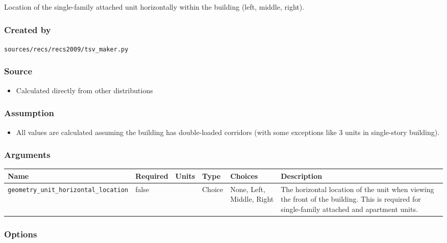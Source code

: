 Location of the single-family attached unit horizontally within the
building (left, middle, right).

\subsubsection{Created by}\label{created-by-44}

\texttt{sources/recs/recs2009/tsv\_maker.py}

\subsubsection{Source}\label{source-43}

\begin{itemize}
 
\item
  Calculated directly from other distributions
\end{itemize}

\subsubsection{Assumption}\label{assumption-24}

\begin{itemize}
 
\item
  All values are calculated assuming the building has double-loaded
  corridors (with some exceptions like 3 units in single-story
  building).
\end{itemize}

\subsubsection{Arguments}\label{arguments-28}

\begin{longtable}[]{@{}llllll@{}}
\toprule\noalign{}
Name & Required & Units & Type & Choices & Description \\
\midrule\noalign{}
\endhead
\bottomrule\noalign{}
\endlastfoot
\texttt{geometry\_unit\_horizontal\_location} & false & & Choice & None,
Left, Middle, Right & The horizontal location of the unit when viewing
the front of the building. This is required for single-family attached
and apartment units. \\
\end{longtable}

\subsubsection{Options}\label{options-44}

